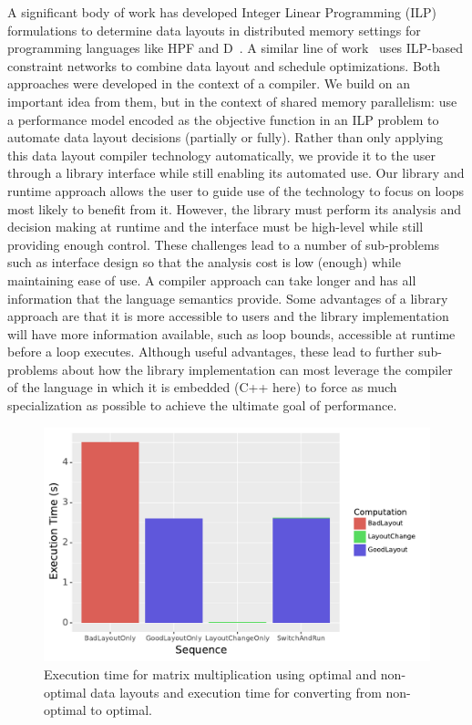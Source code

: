 \documentclass{article}
\begin{document}
A significant body of work has developed Integer Linear Programming (ILP) formulations to determine data layouts in distributed memory settings for programming languages like HPF and D~\cite{bixby1994automatic,kennedy1995automatic,kennedy1998automatic}. 
A similar line of work~\cite{chen2004ilp,chen2005constraint,chen2005integrating, ozturk2011data} uses ILP-based constraint networks to combine data layout and schedule optimizations. 
Both approaches were developed in the context of a compiler. 
We build on an important idea from them, but in the context of shared memory parallelism: use a performance model encoded as the objective function in an ILP problem to automate data layout decisions (partially or fully).
Rather than only applying this data layout compiler technology automatically, we provide it to the user through a library interface while still enabling its automated use.
Our library and runtime approach allows the user to guide use of the technology to focus on loops most likely to benefit from it.
However, the library must perform its analysis and decision making at runtime and the interface must be high-level while still providing enough control. 
These challenges lead to a number of sub-problems such as interface design so that the analysis cost is low (enough) while maintaining ease of use.
A compiler approach can take longer and has all information that the language semantics provide.
Some advantages of a library approach are that it is more accessible to users and the library implementation will have more information available, such as loop bounds, accessible at runtime before a loop executes.
Although useful advantages, these lead to further sub-problems about how the library implementation can most leverage the compiler of the language in which it is embedded (C++ here) to force as much specialization as possible to achieve the ultimate goal of performance.
\begin{figure}
    \centering
	\includegraphics[width=0.5\columnwidth]{IntroExampleGraph.pdf}
	\caption{Execution time for matrix multiplication using optimal and non-optimal data layouts and execution time for converting from non-optimal to optimal.}
	\label{DataLayoutImportance}
\end{figure}
\end{document}
